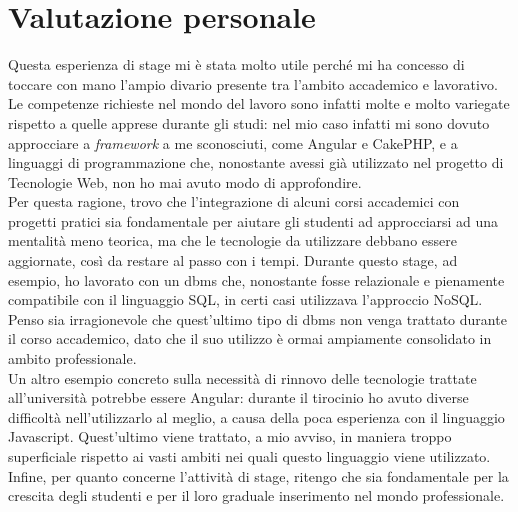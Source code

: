 \section{Valutazione personale}
Questa esperienza di stage mi è stata molto utile perché mi ha concesso di toccare con mano l'ampio divario presente tra l'ambito accademico e lavorativo.\\
Le competenze richieste nel mondo del lavoro sono infatti molte e molto variegate rispetto a quelle apprese durante gli studi: nel mio caso infatti mi sono dovuto approcciare a \textit{\gls{framework}} a me sconosciuti, come Angular e CakePHP, e a linguaggi di programmazione che, nonostante avessi già utilizzato nel progetto di Tecnologie Web, non ho mai avuto modo di approfondire.\\
Per questa ragione, trovo che l'integrazione di alcuni corsi accademici con progetti pratici sia fondamentale per aiutare gli studenti ad approcciarsi ad una mentalità meno teorica, ma che le tecnologie da utilizzare debbano essere aggiornate, così da restare al passo con i tempi. Durante questo stage, ad esempio, ho lavorato con un \acrshort{dbms} che, nonostante fosse relazionale e pienamente compatibile con il linguaggio SQL, in certi casi utilizzava l'approccio NoSQL. Penso sia irragionevole che quest'ultimo tipo di \acrshort{dbms} non venga trattato durante il corso accademico, dato che il suo utilizzo è ormai ampiamente consolidato in ambito professionale.\\
Un altro esempio concreto sulla necessità di rinnovo delle tecnologie trattate all'università potrebbe essere Angular: durante il tirocinio ho avuto diverse difficoltà nell'utilizzarlo al meglio, a causa della poca esperienza con il linguaggio Javascript. Quest'ultimo viene trattato, a mio avviso, in maniera troppo superficiale rispetto ai vasti ambiti nei quali questo linguaggio viene utilizzato. \\
Infine, per quanto concerne l'attività di stage, ritengo che sia fondamentale per la crescita degli studenti e per il loro graduale inserimento nel mondo professionale.